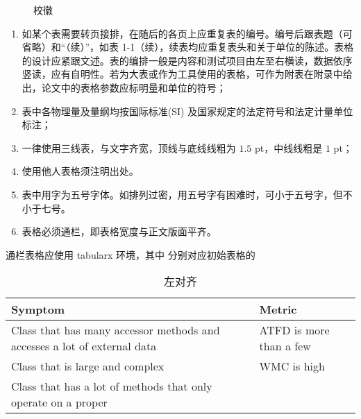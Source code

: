 \begin{figure}[H]
  \subfigg    \subfigg
  \subfigg    \subfigg
  \subfigg    \subfigg
  \caption{校徽}
\end{figure}


\clearpage


\begin{tcolorbox}[colback=red!5!white,colframe=red!75!black]
  \begin{enumerate}[leftmargin=0.5cm]
    \item 如某个表需要转页接排，在随后的各页上应重复表的编号。编号后跟表题（可省略）和“（续）”，如表 1-1（续），续表均应重复表头和关于单位的陈述。表格的设计应紧跟文述。表的编排一般是内容和测试项目由左至右横读，数据依序竖读，应有自明性。若为大表或作为工具使用的表格，可作为附表在附录中给出，论文中的表格参数应标明量和单位的符号；
    \item 表中各物理量及量纲均按国际标准(SI) 及国家规定的法定符号和法定计量单位标注；
    \item 一律使用三线表，与文字齐宽，顶线与底线线粗为 $1.5$ pt，中线线粗是 $1$ pt；
    \item 使用他人表格须注明出处。
    \item 表中用字为五号字体。如排列过密，用五号字有困难时，可小于五号字，但不小于七号。
    \item 表格必须通栏，即表格宽度与正文版面平齐。
  \end{enumerate}
\end{tcolorbox}




通栏表格应使用 tabularx 环境，其中  分别对应初始表格的 

\begin{texcode}[]{}
  \begin{table}[H]
    \caption{左对齐}
    \begin{tabularx}{\textwidth}{XX}
    \toprule
        \textbf{Symptom} & \textbf{Metric} \\
    \midrule
        Class that has many accessor methods and accesses a lot of external data & ATFD is more than a few\\
        Class that is large and complex & WMC is high \\
        Class that has a lot of methods that only operate on a proper & \\
    \bottomrule
    \end{tabularx}
  \end{table}
\end{texcode}

